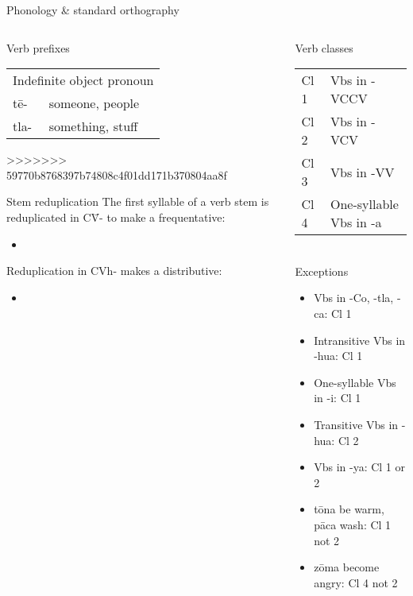 \documentclass[12pt]{beamer}
\newcommand{\nah}[1]{\textcolor{nahgrn}{#1}}
\newcommand{\trs}[1]{\textcolor{nahblu}{#1}}
\begin{document}
\begin{frame}
\begin{columns}[t]
\begin{column}{.22\linewidth}
\begin{block}{Phonology \& standard orthography}
\begin{threeparttable}
\begin{tablenotes}
\begin{frame}
\begin{frame}
\begin{columns}[t]
\begin{column}{0.18\linewidth}
\begin{block}{Verb prefixes}
\begin{enumerate}
\begin{tabular}[t]{ll}
                  \multicolumn{2}{l}{Indefinite object pronoun} \\
                  \nah{tē-}  & \trs{someone, people}            \\
                  \nah{tla-} & \trs{something, stuff}           \\
                \end{tabular}
>>>>>>> 59770b8768397b74808c4f01dd171b370804aa8f
        \end{enumerate}
      \end{block}
      \begin{block}{Stem reduplication}
        The first syllable of a verb stem is reduplicated in \nah{C\=V-} to make a frequentative:
        \begin{itemize}
          \item 
        \end{itemize}
        Reduplication in \nah{CVh-} makes a distributive:
        \begin{itemize}
          \item 
        \end{itemize}
      \end{block}
    \end{column}
    \begin{column}{.18\linewidth}
      \begin{block}{Verb classes}
        \begin{tabular}{ll}
          Cl 1 & Vbs in \nah{-VCCV}           \\
          Cl 2 & Vbs in \nah{-VCV}            \\
          Cl 3 & Vbs in \nah{-VV}             \\
          Cl 4 & One-syllable Vbs in \nah{-a}
        \end{tabular}\\
        Exceptions
        \begin{itemize}
<<<<<<< HEAD
        \item Vbs in \nah{-Co}, \nah{-tla}, \nah{-ca}: Cl 1
        \item Intransitive Vbs in \nah{-hua}: Cl 1
        \item One-syllable Vbs in \nah{-i}: Cl 1
        \item Transitive Vbs in \nah{-hua}: Cl 2
        \item Vbs in \nah{-ya}: Cl 1 or 2
        \item \nah{tōna} \trs{be warm}, \nah{pāca} \trs{wash}: Cl 1 not 2
        \item \nah{zōma} \trs{become angry}: Cl 4 not 2

\end{itemize}
\end{block}
\end{column}
\end{columns}
\end{frame}
\end{frame}
\end{tablenotes}
\end{threeparttable}
\end{block}
\end{column}
\end{columns}
\end{frame}
\end{document}
